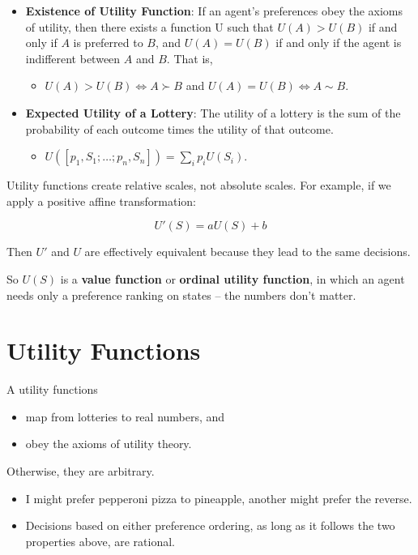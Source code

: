 \documentclass[11pt]{article}
\begin{document}
\begin{itemize}
\item \textbf{Existence of Utility Function}: If an agent’s preferences obey the axioms of utility, then there exists a function U such that \(U(A) > U(B)\) if and only if \(A\) is preferred to \(B\), and \(U(A) = U(B)\) if and only if the agent is indifferent between \(A\) and \(B\). That is,

\begin{itemize}
\item \(U(A) > U(B) \iff A \succ B\) and \(U(A) = U(B) \iff A \sim B\).
\end{itemize}

\item \textbf{Expected Utility of a Lottery}: The utility of a lottery is the sum of the probability of each outcome times the utility of that outcome.

\begin{itemize}
\item \(U([p_1,S_1; \dots ; p_n,S_n]) = \sum_i p_i U(S_i)\).
\end{itemize}
\end{itemize}

Utility functions create relative scales, not absolute scales.  For example, if we apply a positive affine transformation:

\begin{equation*}
U'(S) = aU(S) + b \tag{16.2}
\end{equation*}

Then \(U'\) and \(U\) are effectively equivalent because they lead to the same decisions.

So \(U(S)\) is a \textbf{value function} or \textbf{ordinal utility function}, in which an agent needs only a preference ranking on states -- the numbers don’t matter.
\section{Utility Functions}
\label{sec:orgffe762a}

A utility functions

\begin{itemize}
\item map from lotteries to real numbers, and
\item obey the axioms of utility theory.
\end{itemize}

Otherwise, they are arbitrary.

\begin{itemize}
\item I might prefer pepperoni pizza to pineapple, another might prefer the reverse.
\item Decisions based on either preference ordering, as long as it follows the two properties above, are rational.
\end{itemize}
\end{document}
